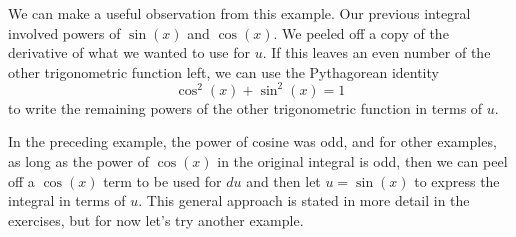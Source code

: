 \documentclass{ximera}
\begin{document}
We can make a useful observation from this example. Our previous integral involved powers of $\sin(x)$ and $\cos(x)$. We peeled off a copy of the derivative of what we wanted to use for $u$.  If this leaves an even number of the other trigonometric function left, we can use the Pythagorean identity \[\cos^{2}(x)+ \sin^{2}(x) =1\] to write the remaining powers of the other trigonometric function in terms of $u$.  

In the preceding example, the power of cosine was odd, and for other examples, as long as the power of $\cos(x)$ in the original integral is odd, then we can peel off a $\cos(x)$ term to be used for $du$ and then let $u=\sin(x)$ to express the integral in terms of $u$.  This general approach is stated in more detail in the exercises, but for now let's try another example.
\end{document}
